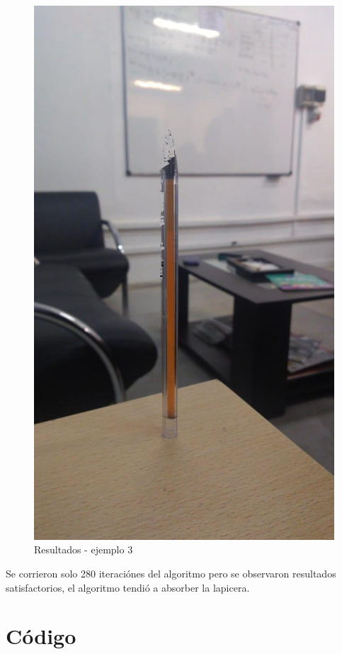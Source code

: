 \documentclass[conference]{IEEEtran}
\begin{document}
\begin{figure}[H]
\begin{centering}
\includegraphics[scale=0.18]{imagen280.jpeg}
\par\end{centering}
\caption{Resultados - ejemplo 3}
\end{figure}
Se corrieron solo 280 iteraciónes del algoritmo pero se observaron resultados satisfactorios, el algoritmo tendió a absorber la lapicera.

\section{Código}
\end{document}
